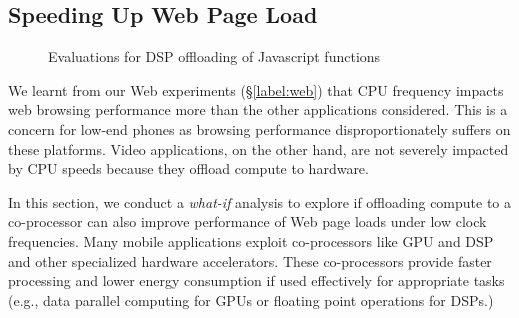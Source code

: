 
\subsection{Speeding Up Web Page Load} \label{label:whatif}

\begin{figure*}[h]
\begin{center}
 \end{center}
 \begin{center}    
     \end{center}

      \begin{center}    
          \hspace{0.25\linewidth}
     \end{center}

   	\caption{Evaluations for DSP offloading of Javascript functions}
     \label{fig:dsp}
\end{figure*}

We learnt from our Web experiments (\S\ref{label:web}) that 
CPU frequency impacts web browsing performance more
than the other applications considered. This is a concern
for low-end phones as browsing performance
disproportionately suffers on these platforms. Video applications, on the other hand, are not severely impacted by CPU speeds because they offload compute to hardware. 

In this section, we conduct a {\em what-if} analysis to explore if offloading compute to a co-processor can also improve performance of Web page loads under low clock frequencies. Many mobile applications exploit co-processors like GPU and DSP and other specialized hardware accelerators. These co-processors provide faster processing and lower energy consumption if used effectively for appropriate
tasks (e.g., data parallel computing
for GPUs or floating point operations for DSPs.)
 
